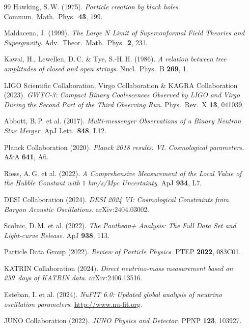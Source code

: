 \documentclass[12pt,a4paper,twoside]{article}
\begin{document}
\begin{thebibliography}{99}
Hawking, S.\,W. (1975).
\textit{Particle creation by black holes}.
Commun.\ Math.\ Phys.\ \textbf{43}, 199.

Maldacena, J. (1999).
\textit{The Large $N$ Limit of Superconformal Field Theories and Supergravity}.
Adv.\ Theor.\ Math.\ Phys.\ \textbf{2}, 231.

Kawai, H., Lewellen, D.\,C. \& Tye, S.-H.\,H. (1986).
\textit{A relation between tree amplitudes of closed and open strings}.
Nucl.\ Phys.\ B \textbf{269}, 1.

LIGO Scientific Collaboration, Virgo Collaboration \& KAGRA Collaboration (2023).
\textit{GWTC-3: Compact Binary Coalescences Observed by LIGO and Virgo During the Second Part of the Third Observing Run}.
Phys.\ Rev.\ X \textbf{13}, 041039.

Abbott, B.\,P. et al. (2017).
\textit{Multi-messenger Observations of a Binary Neutron Star Merger}.
ApJ Lett.\ \textbf{848}, L12.

Planck Collaboration (2020).
\textit{Planck 2018 results. VI. Cosmological parameters}.
A\&A \textbf{641}, A6.

Riess, A.\,G. et al. (2022).
\textit{A Comprehensive Measurement of the Local Value of the Hubble Constant with $1$ km/s/Mpc Uncertainty}.
ApJ \textbf{934}, L7.

DESI Collaboration (2024).
\textit{DESI 2024 VI: Cosmological Constraints from Baryon Acoustic Oscillations}.
arXiv:2404.03002.

Scolnic, D.\,M. et al. (2022).
\textit{The Pantheon+ Analysis: The Full Data Set and Light-curve Release}.
ApJ \textbf{938}, 113.

Particle Data Group (2022).
\textit{Review of Particle Physics}.
PTEP \textbf{2022}, 083C01.

KATRIN Collaboration (2024).
\textit{Direct neutrino-mass measurement based on 259~days of KATRIN data}.
arXiv:2406.13516.

Esteban, I. et al. (2024).
\textit{NuFIT 6.0: Updated global analysis of neutrino oscillation parameters}.
\url{http://www.nu-fit.org}.

JUNO Collaboration (2022).
\textit{JUNO Physics and Detector}.
PPNP \textbf{123}, 103927.


\end{thebibliography}
\end{document}
